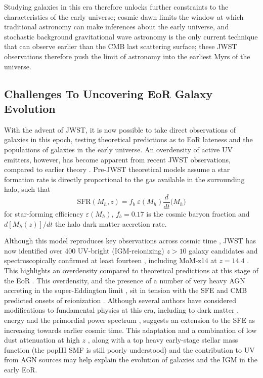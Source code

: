 \documentclass[fleqn,usenatbib]{mnras}
\begin{document}
Studying galaxies in this era therefore unlocks further constraints to the characteristics of the early universe; cosmic dawn limits the window at which traditional astronomy can make inferences about the early universe, and stochastic background gravitational wave astronomy is the only current technique that can observe earlier than the CMB last scattering surface; these JWST observations therefore push the limit of astronomy into the earliest Myrs of the universe.



\subsection{Challenges To Uncovering EoR Galaxy Evolution}
With the advent of JWST, it is now possible to take direct observations of galaxies in this epoch, testing theoretical predictions as to EoR lateness and the populations of galaxies in the early universe. An overdensity of active UV emitters, however, has become apparent from recent JWST observations, compared to earlier theory \citep{Tacchella_2018,tacchella_2025}. Pre-JWST theoretical models \citep{Tacchella_2018, Mason_2015} assume a star formation rate is directly proportional to the gas available in the surrounding halo, such that
\begin{equation}
    \mathrm{SFR}(M_h,z)=f_b\;\varepsilon(M_h)\frac{d}{dt}\big(M_h\big)
\end{equation}
for star-forming efficiency $\varepsilon(M_h)$, $f_b=0.17$ is the cosmic baryon fraction and $d[M_h(z)]/dt$ the halo dark matter accretion rate.

Although this model reproduces key observations across cosmic time  \citep{Mason_2015}, JWST has now identified over 400 UV-bright (IGM-reionizing) $z>10$ galaxy candidates \citep{hainline_2023} and spectroscopically confirmed at least fourteen \citep{curtislake_2022,schouws_2024}, including MoM-z14 at $z=14.4$ \citep{naidu_2025}. This highlights an overdensity compared to theoretical predictions at this stage of the EoR \citep{tacchella_2025}. This overdensity, and the presence of a number of very heavy AGN accreting in the super-Eddington limit \citep{maiolino_2024, Tacchella_2023_2,greene_2024}, sit in tension with the SFE and CMB predicted onsets of reionization \citep{planck_2016, Mason_2015}. Although several authors have considered modifications to fundamental physics at this era, including to dark matter \citep{dayal_2024}, energy \citep{shen_2024} and the primordial power spectrum \citep{Parashari_2023},  \cite{tacchella_2025} suggests an extension to the SFE as increasing towards earlier cosmic time. This adaptation and a combination of low dust attenuation at high $z$ \citep{Mirocha_2022}, along with a top heavy early-stage stellar mass function \citep{Yung_2023}(the popIII SMF is still poorly understood) and the contribution to UV from AGN sources may help explain the evolution of galaxies and the IGM in the early EoR.
\end{document}
